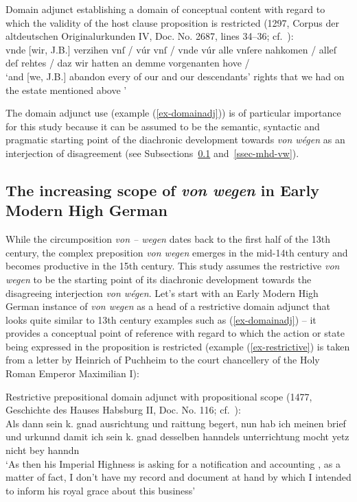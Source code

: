 \documentclass[output=paper
  ,nobabel
  ,draftmode
  ,babelshorthands
  ,colorlinks, citecolor=brown
]{langscibook}
\begin{document}
\eanoraggedright\label{ex-domainadj} 
Domain adjunct establishing a domain of conceptual content with regard to which the validity of the host clause proposition is restricted (1297, Corpus der altdeutschen Originalurkunden IV, Doc. No. 2687, lines 34--36; cf.\ \citealp[78]{deBoorHaacke1963}):\\[2pt]
	vnde [wir, J.B.] verzihen vnſ / vúr vnſ / vnde vúr alle vnſere nahkomen / alleſ deſ rehtes / daz wir hatten an demme vorgenanten hove / \\
`and [we, J.B.] abandon every of our and our descendants' rights that we had on the estate mentioned above '
\z

\noindent
The domain adjunct use (example (\ref{ex-domainadj})) is of particular importance for this study because it can be assumed to be the semantic, syntactic and pragmatic starting point of the diachronic development towards \emph{von wégen} as an interjection of disagreement (see Subsections~\ref{ssec-frnhd-scope-vw} and~\ref{ssec-mhd-vw}). 

\subsection{The increasing scope of \emph{von wegen} in Early Modern High German}\label{ssec-frnhd-scope-vw}

\largerpage[-1]
While the circumposition \emph{von – wegen} dates back to the first half of the 13th century, the
complex preposition \emph{von wegen} emerges in the mid-14th century and becomes productive in the
15th century. This study assumes the restrictive \emph{von wegen} to be the starting point of its
diachronic development towards the disagreeing interjection \emph{von wégen}. Let’s start with an
Early Modern High German instance of \emph{von wegen} as a head of a restrictive domain adjunct that looks quite similar to 13th century examples such as (\ref{ex-domainadj}) -- it provides a conceptual point of reference with regard to which the action or state being expressed in the proposition is restricted (example (\ref{ex-restrictive}) is taken from a letter by Heinrich of Puchheim to the court chancellery of the Holy Roman Emperor Maximilian I):

\eanoraggedright\label{ex-restrictive} 
Restrictive prepositional domain adjunct with propositional scope (1477, Geschichte des Hauses Habsburg II, Doc. No. 116; cf.\ \citealp[304]{Chmel1855}):\\[2pt]
Als dann sein k. gnad  ausrichtung und raittung begert, nun hab ich meinen brief und urkunnd damit ich sein k. gnad desselben hanndels unterrichtung mocht yetz nicht bey hanndn \\
	`As then his Imperial Highness is asking for a notification and accounting , as a matter of fact, I don’t have my record and document at hand by which I intended to inform his royal grace about this business'
\z
\end{document}

